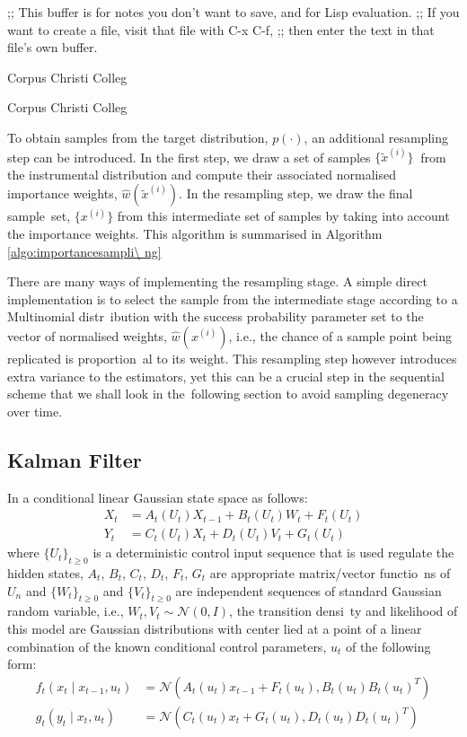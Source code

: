 ;; This buffer is for notes you don't want to save, and for Lisp evaluation.
;; If you want to create a file, visit that file with C-x C-f,
;; then enter the text in that file's own buffer.

Corpus Christi Colleg

Corpus Christi Colleg

To obtain samples from the target distribution, $p(\cdot)$, an additional resampling step can be introduced. In the first step, we draw a set of samples $\{\tilde{x}^{(i)}\}\
$ from the instrumental distribution and compute their associated normalised importance weights, $\hat{w}(\tilde{x}^{(i)})$. In the resampling step, we draw the final sample\
 set, $\{x^{(i)}\}$ from this intermediate set of samples by taking into account the importance weights. This algorithm is summarised in Algorithm \ref{algo:importancesampli\
ng}

There are many ways of implementing the resampling stage. A simple direct implementation is to select the sample from the intermediate stage according to a Multinomial distr\
ibution with the success probability parameter set to the vector of normalised weights, $\hat{w}(x^{(i)})$, i.e., the chance of a sample point being replicated is proportion\
al to its weight. This resampling step however introduces extra variance to the estimators, yet this can be a crucial step in the sequential scheme that we shall look in the\
 following section to avoid sampling degeneracy over time.

\subsection{Kalman Filter}
\label{sec:KF}
In a conditional linear Gaussian state space as follows:
\begin{align}
  X_t &= A_t(U_t)X_{t-1} + B_t(U_t)W_t + F_t(U_t) \nonumber \\
  Y_t &= C_t(U_t)X_t + D_t(U_t)V_t + G_t(U_t)
\label{eq:gaussianmodel}
\end{align}
where $\{U_t\}_{t \geq 0}$ is a deterministic control input sequence that is used regulate the hidden states, $A_t$, $B_t$, $C_t$, $D_t$, $F_t$, $G_t$ are appropriate matrix/vector functio\
ns of $U_n$ and  $\{W_t\}_{t \geq 0}$ and  $\{V_t\}_{t \geq 0}$ are independent sequences of standard Gaussian random variable, i.e., $W_t, V_t \sim \mathcal{N}(0,I)$, the transition densi\
ty and likelihood of this model are Gaussian distributions with center lied at a point of a linear combination of the known conditional control parameters, $u_t$ of the following form:
\begin{align}
  f_t(x_t \mid x_{t-1}, u_t) &= \mathcal{N}(A_t(u_t) x_{t-1} + F_t(u_t), B_t(u_t)B_t(u_t)^T) \nonumber \\
  g_t(y_t \mid x_t, u_t)    &= \mathcal{N}(C_t(u_t) x_t + G_t(u_t), D_t(u_t)D_t(u_t)^T)
\end{align}

